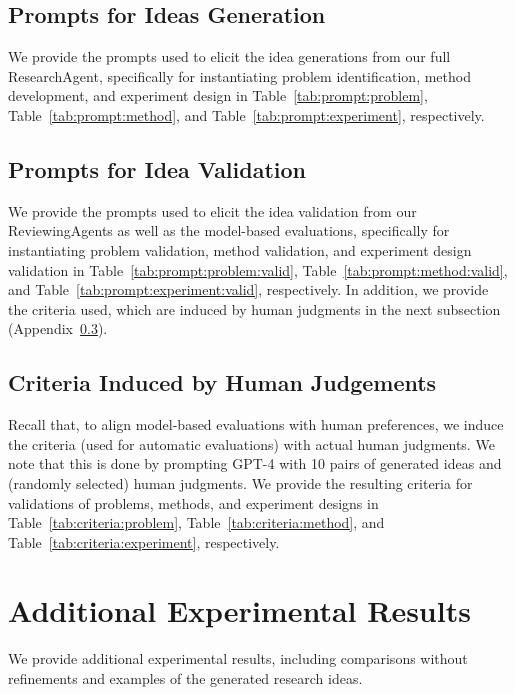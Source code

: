 

\subsection{Prompts for Ideas Generation}
\label{appendix:prompts:generation}

We provide the prompts used to elicit the idea generations from our full ResearchAgent, specifically for instantiating problem identification, method development, and experiment design in Table~\ref{tab:prompt:problem}, Table~\ref{tab:prompt:method}, and Table~\ref{tab:prompt:experiment}, respectively.

\subsection{Prompts for Idea Validation}
\label{appendix:prompts:validation}

We provide the prompts used to elicit the idea validation from our ReviewingAgents as well as the model-based evaluations, specifically for instantiating problem validation, method validation, and experiment design validation in Table~\ref{tab:prompt:problem:valid}, Table~\ref{tab:prompt:method:valid}, and Table~\ref{tab:prompt:experiment:valid}, respectively. In addition, we provide the criteria used, which are induced by human judgments in the next subsection (Appendix~\ref{appendix:criteria}).

\subsection{Criteria Induced by Human Judgements}
\label{appendix:criteria}

Recall that, to align model-based evaluations with human preferences, we induce the criteria (used for automatic evaluations) with actual human judgments. We note that this is done by prompting GPT-4 with 10 pairs of generated ideas and (randomly selected) human judgments. We provide the resulting criteria for validations of problems, methods, and experiment designs in Table~\ref{tab:criteria:problem}, Table~\ref{tab:criteria:method}, and Table~\ref{tab:criteria:experiment}, respectively.  



\section{Additional Experimental Results}
We provide additional experimental results, including comparisons without refinements and examples of the generated research ideas. 


